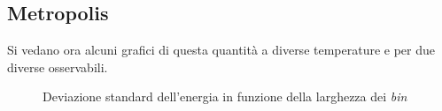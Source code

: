 \subsection*{Metropolis}
Si vedano ora alcuni grafici di questa quantità a diverse temperature e per due diverse osservabili.
\begin{figure}[h!]
\caption{Deviazione standard dell'energia in funzione della larghezza dei \emph{bin} }
\end{figure}
